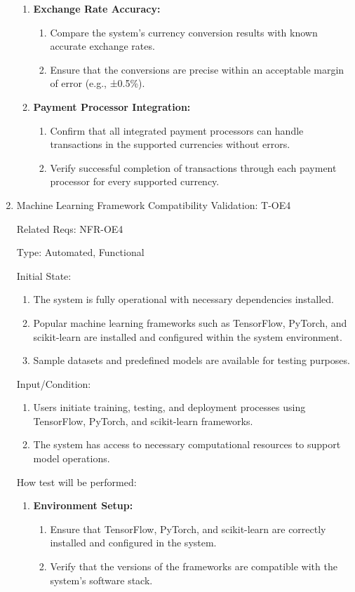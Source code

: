 \documentclass[12pt, titlepage]{article}
\begin{document}
\begin{enumerate}
\begin{enumerate}
    \item \textbf{Exchange Rate Accuracy:}
    \begin{enumerate}
        \item Compare the system's currency conversion results with known accurate exchange rates.
        \item Ensure that the conversions are precise within an acceptable margin of error (e.g., ±0.5\%).
    \end{enumerate}
    
    \item \textbf{Payment Processor Integration:}
    \begin{enumerate}
        \item Confirm that all integrated payment processors can handle transactions in the supported currencies without errors.
        \item Verify successful completion of transactions through each payment processor for every supported currency.
    \end{enumerate}
    
\end{enumerate}

\item{Machine Learning Framework Compatibility Validation: T-OE4\\}

Related Reqs: NFR-OE4

Type: Automated, Functional

Initial State:
\begin{enumerate}
    \item The system is fully operational with necessary dependencies installed.
    \item Popular machine learning frameworks such as TensorFlow, PyTorch, and scikit-learn are installed and configured within the system environment.
    \item Sample datasets and predefined models are available for testing purposes.
\end{enumerate}
Input/Condition:
\begin{enumerate}
    \item Users initiate training, testing, and deployment processes using TensorFlow, PyTorch, and scikit-learn frameworks.
    \item The system has access to necessary computational resources to support model operations.
\end{enumerate}
How test will be performed:
\begin{enumerate}
    \item \textbf{Environment Setup:}
    \begin{enumerate}
        \item Ensure that TensorFlow, PyTorch, and scikit-learn are correctly installed and configured in the system.
        \item Verify that the versions of the frameworks are compatible with the system's software stack.
    \end{enumerate}
    

\end{enumerate}
\end{enumerate}
\end{document}
